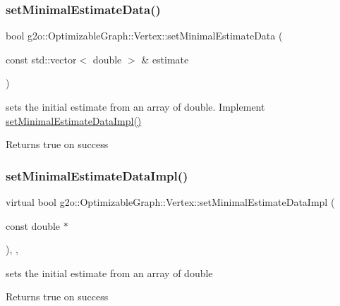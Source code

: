 \subsubsection{\texorpdfstring{set\+Minimal\+Estimate\+Data()}{setMinimalEstimateData()}\hspace{0.1cm}{\footnotesize\ttfamily [2/2]}}
{\footnotesize\ttfamily bool g2o\+::\+Optimizable\+Graph\+::\+Vertex\+::set\+Minimal\+Estimate\+Data (\begin{DoxyParamCaption}\item[{const std\+::vector$<$ double $>$ \&}]{estimate }\end{DoxyParamCaption})\hspace{0.3cm}{\ttfamily [inline]}}

sets the initial estimate from an array of double. Implement \mbox{\hyperlink{classg2o_1_1_optimizable_graph_1_1_vertex_a088ecbdde86968f3896b2320f80ee396}{set\+Minimal\+Estimate\+Data\+Impl()}} \begin{DoxyReturn}{Returns}
true on success 
\end{DoxyReturn}
\mbox{\label{classg2o_1_1_optimizable_graph_1_1_vertex_a088ecbdde86968f3896b2320f80ee396}} 
\subsubsection{\texorpdfstring{set\+Minimal\+Estimate\+Data\+Impl()}{setMinimalEstimateDataImpl()}}
{\footnotesize\ttfamily virtual bool g2o\+::\+Optimizable\+Graph\+::\+Vertex\+::set\+Minimal\+Estimate\+Data\+Impl (\begin{DoxyParamCaption}\item[{const double $\ast$}]{ }\end{DoxyParamCaption})\hspace{0.3cm}{\ttfamily [inline]}, {\ttfamily [protected]}, {\ttfamily [virtual]}}

sets the initial estimate from an array of double \begin{DoxyReturn}{Returns}
true on success 
\end{DoxyReturn}
\mbox{\label{classg2o_1_1_optimizable_graph_1_1_vertex_ab10678592b5e707bf4abdc0ff6b8e4bf}} 
